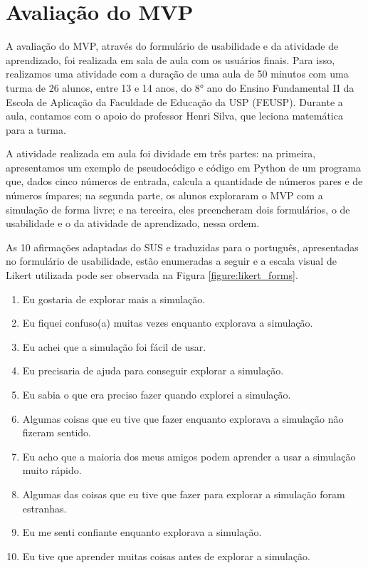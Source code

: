 

\chapter{Avaliação do MVP} \label{evaluation}

A avaliação do MVP, através do formulário de usabilidade e da atividade de aprendizado, foi realizada em sala de aula com os usuários finais. Para isso, realizamos uma atividade com a duração de uma aula de 50 minutos com uma turma de 26 alunos, entre 13 e 14 anos, do 8° ano do Ensino Fundamental II da Escola de Aplicação da Faculdade de Educação da USP (FEUSP). Durante a aula, contamos com o apoio do professor Henri Silva, que leciona matemática para a turma. 

A atividade realizada em aula foi dividade em três partes: na primeira, apresentamos um exemplo de pseudocódigo e código em Python de um programa que, dados cinco números de entrada, calcula a quantidade de números pares e de números ímpares; na segunda parte, os alunos exploraram o MVP com a simulação de forma livre; e na terceira, eles preencheram dois formulários, o de usabilidade e o da atividade de aprendizado, nessa ordem.

As 10 afirmações adaptadas do SUS e traduzidas para o português, apresentadas no formulário de usabilidade, estão enumeradas a seguir e a escala visual de Likert utilizada pode ser observada na Figura \ref{figure:likert_forms}.

\begin{enumerate}
    \item Eu gostaria de explorar mais a simulação.
    \item Eu fiquei confuso(a) muitas vezes enquanto explorava a simulação.
    \item Eu achei que a simulação foi fácil de usar.
    \item Eu precisaria de ajuda para conseguir explorar a simulação.
    \item Eu sabia o que era preciso fazer quando explorei a simulação.
    \item Algumas coisas que eu tive que fazer enquanto explorava a simulação não fizeram sentido.
    \item Eu acho que a maioria dos meus amigos podem aprender a usar a simulação muito rápido.
    \item Algumas das coisas que eu tive que fazer para explorar a simulação foram estranhas.
    \item Eu me senti confiante enquanto explorava a simulação.
    \item Eu tive que aprender muitas coisas antes de explorar a simulação.
\end{enumerate}

